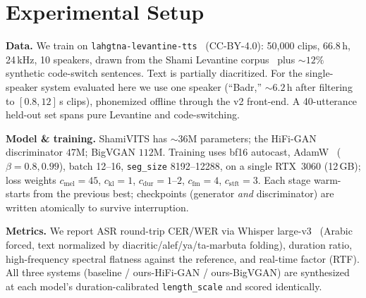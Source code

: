 \documentclass[10pt,twocolumn]{article}
\begin{document}
\section{Experimental Setup}
\textbf{Data.} We train on \texttt{lahgtna-levantine-tts}~\cite{lahgtna} (CC-BY-4.0): 50{,}000
clips, 66.8\,h, 24\,kHz, 10 speakers, drawn from the Shami Levantine corpus~\cite{shami} plus
\(\sim\!12\%\)
synthetic code-switch sentences. Text is partially diacritized. For the single-speaker system
evaluated here we use one speaker (``Badr,'' \(\sim\!6.2\)\,h after filtering to
\([0.8,12]\)\,s clips), phonemized offline through the v2 front-end. A 40-utterance held-out
set spans pure Levantine and code-switching.

\textbf{Model \& training.} ShamiVITS has \(\sim\!36\)M parameters; the HiFi-GAN
discriminator \(47\)M; BigVGAN \(112\)M. Training uses bf16 autocast, AdamW~\cite{adamw}
(\(\beta\!=\!0.8,0.99\)), batch 12--16, \texttt{seg\_size} 8192--12288, on a single RTX~3060
(12\,GB); loss weights \(c_{\text{mel}}\!=\!45\), \(c_{\text{kl}}\!=\!1\),
\(c_{\text{dur}}\!=\!1\text{--}2\), \(c_{\text{fm}}\!=\!4\), \(c_{\text{stft}}\!=\!3\). Each
stage warm-starts from the previous best; checkpoints (generator \emph{and} discriminator)
are written atomically to survive interruption.

\textbf{Metrics.} We report ASR round-trip CER/WER via Whisper large-v3~\cite{whisper}
(Arabic forced, text normalized by diacritic/alef/ya/ta-marbuta folding), duration ratio,
high-frequency spectral flatness against the reference, and real-time factor (RTF). All three
systems (baseline / ours-HiFi-GAN / ours-BigVGAN) are synthesized at each model's
duration-calibrated \texttt{length\_scale} and scored identically.
\end{document}
